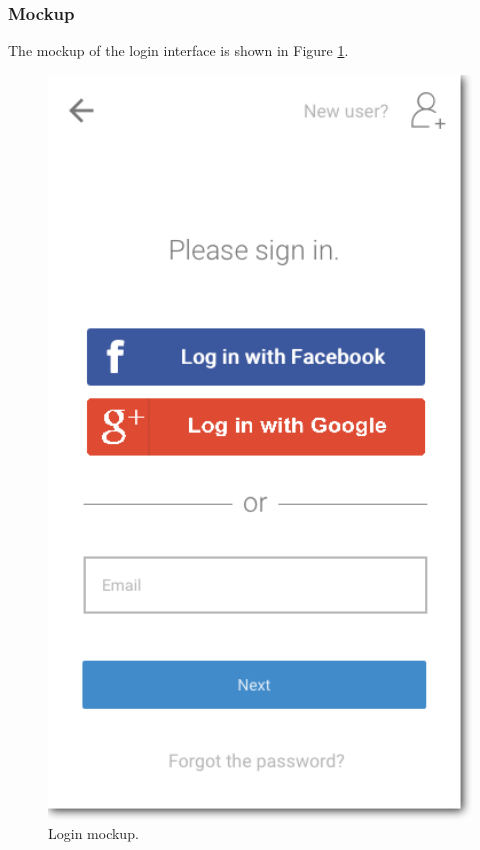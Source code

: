 \subsubsection{Mockup}
The mockup of the login interface is shown in Figure \ref{fig:MockupLogin}.
\begin{figure}
	\centering
	\includegraphics[width=4.5in]{./images/login.png}
	\caption{Login mockup.}
	\label{fig:MockupLogin}
\end{figure}
\vspace*{21\baselineskip}